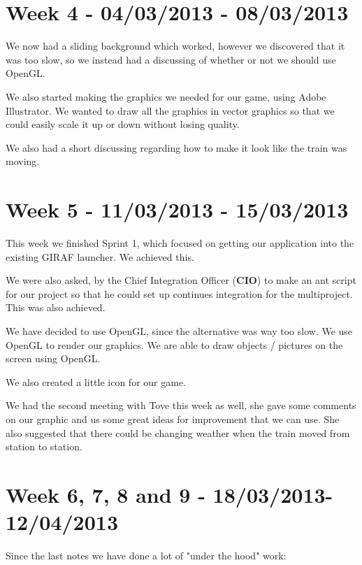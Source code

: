 \section*{Week 4 - 04/03/2013 - 08/03/2013}
We now had a sliding background which worked, however we discovered that it was too slow, so we instead had a discussing of whether or not we should use OpenGL. 

We also started making the graphics we needed for our game, using Adobe Illustrator. We wanted to draw all the graphics in vector graphics so that we could easily scale it up or down without losing quality. 

We also had a short discussing regarding how to make it look like the train was moving. 

\section*{Week 5 - 11/03/2013 - 15/03/2013}
This week we finished Sprint 1, which focused on getting our application into the existing GIRAF launcher. We achieved this. 

We were also asked, by the Chief Integration Officer (\textbf{CIO}) to make an ant script for our project so that he could set up continues integration for the multiproject. This was also achieved. 

We have decided to use OpenGL, since the alternative was way too slow. We use OpenGL to render our graphics. We are able to draw objects / pictures on the screen using OpenGL. 

We also created a little icon for our game. 

We had the second meeting with Tove this week as well, she gave some comments on our graphic and us some great ideas for improvement that we can use. She also suggested that there could be changing weather when the train moved from station to station. 

\section*{Week 6, 7, 8 and 9 - 18/03/2013-12/04/2013}
Since the last notes we have done a lot of "under the hood" work:

